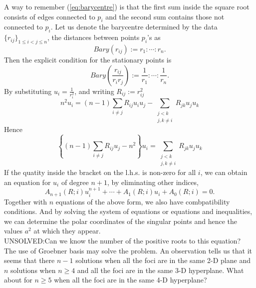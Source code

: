 \documentclass{article}
\begin{document}
A way to remember (\ref{eq:barycentre}) is that the first sum inside the square root consists of edges connected to $p_i$ and the second sum contains those not connected to $p_i$. Let us denote the barycentre determined by the data $\{r_{ij}\}_{1\le i < j\le n}$, the distances between points $p_i$'s as
\begin{equation}
\label{ }
Bary(r_{ij}) := r_1 : \cdots : r_n  .
\end{equation}
Then the explicit condition for the stationary points is
\begin{equation}
\label{ }
Bary\left(\frac{r_{ij}}{r_i r_j}\right) := \frac{1}{r_1} : \cdots : \frac{1}{r_n}  .
\end{equation}
By substituting $u_i = \frac{1}{r_i^2}$, and writing $R_{ij} := r^2_{ij}$
\begin{equation}
\label{}
n^2 u_i =   (n-1)\sum_{i\ne j } R_{ij}u_i u_j - \sum_{\substack{j < k \\ j,k \ne i}}R_{jk}u_j u_k
\end{equation}
Hence
\begin{equation}
\label{}
\left\{ (n-1)\sum_{i\ne j } R_{ij} u_j - n^2 \right\} u_i =     \sum_{\substack{j < k \\ j,k \ne i}}R_{jk}u_j u_k
\end{equation}
If the quatity inside the bracket on the l.h.s. is non-zero for all $i$, we can obtain an equation for $u_i$ of degree $n+1$, by eliminating other indices,
\begin{equation}
\label{}
A_{n+1}(R;i)u_i^{n+1} + \cdots +A_{1}(R;i)u_i + A_0(R;i) = 0.
\end{equation}
Together with $n$ equations of the above form, we also have combpatibility conditions. And by solving the system of equations or equations and inequalities, we can determine the polar coordinates of the singular points and hence the values $a^2$ at which they appear.\\
UNSOLVED:Can we know the number of the positive roots to this equation?\\
The use of Groebner basis may solve the problem.
 An observation tells us that it seems that there $n-1$ solutions when all the foci are in the same 2-D plane and $n$ solutions when $n\ge 4$ and all the foci are in the same 3-D hyperplane. What about for $n \ge 5$ when all the foci are in the same 4-D hyperplane?
\end{document}

